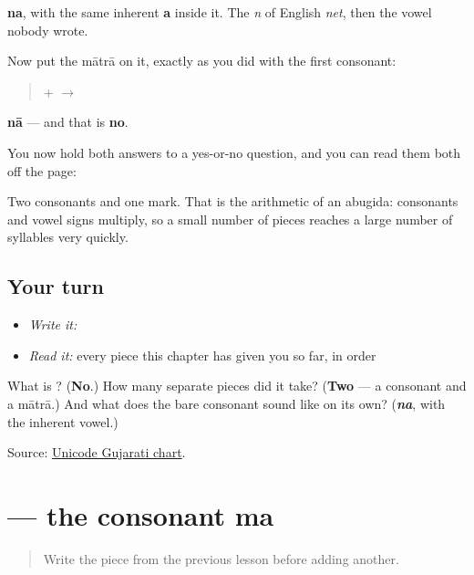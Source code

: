 \textbf{na}, with the same inherent \textbf{a} inside it. The \emph{n} of English \emph{net}, then the vowel nobody wrote.

Now put the mātrā on it, exactly as you did with the first consonant:

\begin{quote}
\textbf{} + \textbf{} $\to$ \textbf{}
\end{quote}

\textbf{nā} — and that is \textbf{no}.

You now hold both answers to a yes-or-no question, and you can read them both off the page:

\begin{quote}
\textbf{}   \textbf{}
\end{quote}

Two consonants and one mark. That is the arithmetic of an abugida: consonants and vowel signs multiply, so a small number of pieces reaches a large number of syllables very quickly.

\subsection*{Your turn}
\begin{itemize}
\raggedright
  \item \emph{Write it:} 
  \item \emph{Read it:} every piece this chapter has given you so far, in order
\end{itemize}

\begin{tcolorbox}[breakable,colback=teal!4,colframe=teal!35!black,title={Before you move on}]
What is \textbf{}? (\textbf{No}.) How many separate pieces did it take? (\textbf{Two} — a consonant and a mātrā.) And what does the bare consonant sound like on its own? (\emph{\textbf{na}}, with the inherent vowel.)

Source: \href{https://www.unicode.org/charts/PDF/U0A80.pdf}{Unicode Gujarati chart}.
\end{tcolorbox}
\section[ma]{ — the consonant ma}

\label{lesson:GU-W01-ma}



\begin{quote}
Write the piece from the previous lesson before adding another.
\end{quote}

